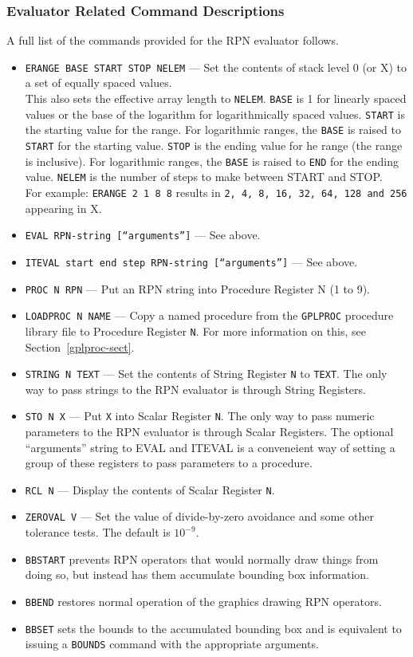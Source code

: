 \documentclass[a4paper,twoside,11pt]{article}
\newcommand{\textttc}[1]{\texttt{\textcolor{OurRed}{#1}}}
\begin{document}
\subsubsection{Evaluator Related Command Descriptions}
A full list of the commands provided for the RPN evaluator follows.
\begin{itemize}
\item \textttc{ERANGE BASE START STOP NELEM} --- Set the contents of stack level 0 (or X) to a set of equally spaced values.\\
  This also sets the effective array length to \texttt{NELEM}.
  \texttt{BASE} is 1 for linearly spaced values or the base of the logarithm for logarithmically spaced values.
  \texttt{START} is the starting value for the range.
  For logarithmic ranges, the \texttt{BASE} is raised to \texttt{START} for the starting value.
  \texttt{STOP} is the ending value for he range (the range is inclusive).
  For logarithmic ranges, the \texttt{BASE} is raised to \texttt{END} for the ending value.
  \texttt{NELEM} is the number of steps to make between START and STOP.\\
  For example: \texttt{ERANGE 2 1 8 8} results in \texttt{2, 4, 8, 16, 32, 64, 128 and 256} appearing in X.
\item \textttc{EVAL RPN-string [``arguments'']} --- See above.
\item \textttc{ITEVAL start end step RPN-string [``arguments'']} --- See above.
\item \textttc{PROC N RPN} --- Put an RPN string into Procedure Register N (1 to 9).
\item \textttc{LOADPROC N NAME} --- Copy a named procedure from the \texttt{GPLPROC} procedure library file to Procedure Register \texttt{N}.
  For more information on this, see Section~\ref{gplproc-sect}.
\item \textttc{STRING N TEXT} --- Set the contents of String Register \texttt{N} to \texttt{TEXT}.
  The only way to pass strings to the RPN evaluator is through String Registers.
\item \textttc{STO N X} --- Put \texttt{X} into Scalar Register \texttt{N}. The only way to pass numeric parameters to the RPN evaluator is through
  Scalar Registers. The optional ``arguments'' string to EVAL and ITEVAL is a conveneient way of setting a group of these
  registers to pass parameters to a procedure.
\item \textttc{RCL N} --- Display the contents of Scalar Register \texttt{N}.
\item \textttc{ZEROVAL V} --- Set the value of divide-by-zero avoidance and some other tolerance tests. The default is $10^{-9}$.
\item \textttc{BBSTART} prevents RPN operators that would normally draw things from doing so, but instead has them accumulate bounding
	box information.
\item \textttc{BBEND} restores normal operation of the graphics drawing RPN operators.
\item \textttc{BBSET} sets the bounds to the accumulated bounding box and is equivalent to issuing a \texttt{BOUNDS} command with the
	appropriate arguments.
\end{itemize}
\end{document}
